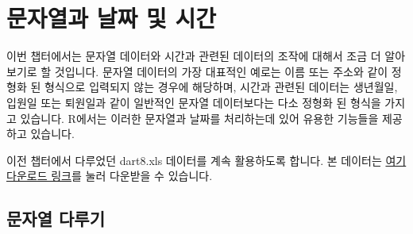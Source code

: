 \documentclass[tutorial.tex]{subfiles}
\begin{document}
\chapter{문자열과 날짜 및 시간}

이번 챕터에서는 문자열 데이터와 시간과 관련된 데이터의 조작에 대해서 조금 더 알아보기로 할 것입니다.
문자열 데이터의 가장 대표적인 예로는 이름 또는 주소와 같이 정형화 된 형식으로 입력되지 않는 경우에 해당하며, 
시간과 관련된 데이터는 생년월일, 입원일 또는 퇴원일과 같이 일반적인 문자열 데이터보다는 다소 정형화 된 형식을 가지고 있습니다.
R에서는 이러한 문자열과 날짜를 처리하는데 있어 유용한 기능들을 제공하고 있습니다.

이전 챕터에서 다루었던 dart8.xls 데이터를 계속 활용하도록 합니다. 
본 데이터는 \href{http://korea.gnu.org/gnustats/dataset/dart8.xls}{여기 다운로드 링크}를 눌러 다운받을 수 있습니다.

\section{문자열 다루기}

\begin{comment}
	rm(list=ls())
	library(XLConnect)
	wb <- loadWorkbook("../dataset/dart8.xls")
	tmp <- readWorksheet(wb, sheet=getSheets(wb))
	mydata <- do.call(rbind, tmp)
	names(mydata)[1] <- c("년도별분기")
	mydata$여행사 <- do.call(rbind, strsplit(rownames(mydata), ".", fixed=TRUE))[,1]
	mydata$여행사 <- factor(mydata$여행사, levels=unique(mydata$여행사))
	mydata$번호 <- do.call(rbind, strsplit(rownames(mydata), ".", fixed=TRUE))[,2]
	rownames(mydata) <- NULL
	yrQ <- as.data.frame(do.call(rbind, strsplit(as.character(mydata$년도별분기), ".", fixed=TRUE)))
	names(yrQ) <- c("년도", "분기")
	mydata <- data.frame(mydata, yrQ)
	mydata <- mydata[,-1]
	mydata$분기 <- factor(mydata$분기, levels=c("03", "06", "09", "12"), labels=c("1분기", "2분기", "3분기", "4분기"))
	mydata$여행사 <- factor(mydata$여행사)
	mydatax <- na.exclude(mydata)

	다트8 <- subset(mydata, subset=(년도 %
	다트8.1 <- 다트8[order(다트8$년도),]
	다트8.1$first <- !duplicated(다트8.1$년도)
	다트8.1$last <- !duplicated(다트8.1$년도, fromLast=TRUE)

	다트8.2 <- 다트8.1[c(FALSE, FALSE, TRUE, TRUE, FALSE, TRUE, FALSE, FALSE, FALSE)]
	다트8.3 <- 다트8.2[order(다트8.2$여행사, 다트8.2$년도), ]
	다트8.3$first <- !duplicated(다트8.3$여행사)
	다트8.3$last <- !duplicated(다트8.3$여행사, fromLast=TRUE)
	다트8.4 <- subset(다트8.3, subset=(first == TRUE | last == TRUE))
	다트8.5 <- 다트8.4[,-c(4:5)]
	다트8.6 <- reshape(다트8.5, timevar="년도", idvar="여행사", direction="wide")
	다트8.6$차이 <- with(다트8.6, 매출액.2010 - 매출액.2008)
	reshape(다트8.6,  v.names=c("매출액"), varying=c("매출액.2008", "매출액.2010"), direction="long", timevar=c("년도"), times=c("2008", "2010"), ids=row.names(다트8.6))
\end{comment}
\end{document}
